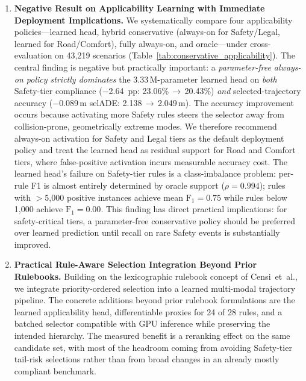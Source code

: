 \begin{enumerate}[label=\textbf{C\arabic*},leftmargin=2.5em]

\item \textbf{Negative Result on Applicability Learning with Immediate Deployment Implications.} We systematically compare four applicability policies---learned head, hybrid conservative (always-on for Safety/Legal, learned for Road/Comfort), fully always-on, and oracle---under cross-evaluation on 43{,}219 scenarios (Table~\ref{tab:conservative_applicability}).  The central finding is negative but practically important: a \emph{parameter-free always-on policy strictly dominates} the 3.33\,M-parameter learned head on \emph{both} Safety-tier compliance ($-$2.64~pp: 23.06\%\,$\to$\,20.43\%) \emph{and} selected-trajectory accuracy ($-$0.089\,m selADE: 2.138\,$\to$\,2.049\,m).  The accuracy improvement occurs because activating more Safety rules steers the selector away from collision-prone, geometrically extreme modes.  We therefore recommend always-on activation for Safety and Legal tiers as the default deployment policy and treat the learned head as residual support for Road and Comfort tiers, where false-positive activation incurs measurable accuracy cost.  The learned head's failure on Safety-tier rules is a class-imbalance problem: per-rule F1 is almost entirely determined by oracle support ($\rho{=}0.994$); rules with $>$5{,}000 positive instances achieve mean $\text{F}_1{=}0.75$ while rules below 1{,}000 achieve $\text{F}_1{=}0.00$.  This finding has direct practical implications: for safety-critical tiers, a parameter-free conservative policy should be preferred over learned prediction until recall on rare Safety events is substantially improved.

\item \textbf{Practical Rule-Aware Selection Integration Beyond Prior Rulebooks.} Building on the lexicographic rulebook concept of Censi~et~al., we integrate priority-ordered selection into a learned multi-modal trajectory pipeline.  The concrete additions beyond prior rulebook formulations are the learned applicability head, differentiable proxies for 24 of 28 rules, and a batched selector compatible with GPU inference while preserving the intended hierarchy.  The measured benefit is a reranking effect on the same candidate set, with most of the headroom coming from avoiding Safety-tier tail-risk selections rather than from broad changes in an already mostly compliant benchmark.


\end{enumerate}
